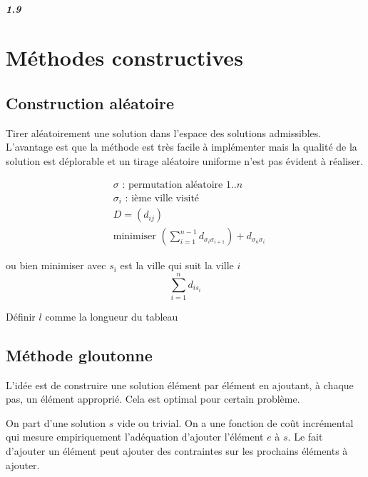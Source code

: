 \documentclass[11pt,a4paper]{report}
\begin{document}
\paragraph*{1.9} 

\chapter{Méthodes constructives}

\section{Construction aléatoire}
Tirer aléatoirement une solution dans l'espace des solutions admissibles. L'avantage est que la méthode est très facile à implémenter mais la qualité de la solution est déplorable et un tirage aléatoire uniforme n'est pas évident à réaliser.

\begin{align*}
& \sigma \text{ : permutation aléatoire } 1..n \\
& \sigma_i \text{ : ième ville visité}\\
& D = (d_{ij})\\
& \text{minimiser } (\sum_{i=1}^{n-1} d_{\sigma_i \sigma_{i+1}}) + d_{\sigma_n \sigma_i}
\end{align*}

ou bien minimiser avec $s_i$ est la ville qui suit la ville $i$
$$
\sum_{i=1}^n d_{i s_i}
$$

\begin{algorithm}[H]
Définir $l$ comme la longueur du tableau\;
\end{algorithm}

\section{Méthode gloutonne}

L'idée est de construire une solution élément par élément en ajoutant, à chaque pas, un élément approprié. Cela est optimal pour certain problème.

On part d'une solution $s$ vide ou trivial. On a une fonction de coût incrémental qui mesure empiriquement l'adéquation d'ajouter l'élément $e$ à $s$. Le fait d'ajouter un élément peut ajouter des contraintes sur les prochains éléments à ajouter.
\end{document}
